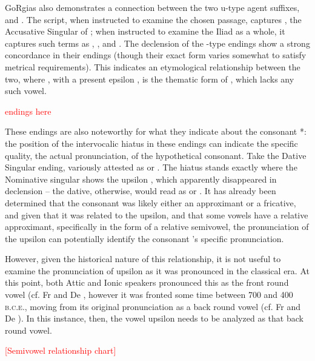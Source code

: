  GoRgias also demonstrates a connection between the two
u-type agent suffixes,  and . The script, when
instructed to examine the chosen passage, captures , the
Accusative Singular of ; when instructed to examine the
Iliad as a whole, it captures such terms as ,
, and . The declension of the -type
endings show a strong concordance in their endings (though
their exact form varies somewhat to satisfy metrical requirements).
This indicates an etymological relationship between the two, where
, with a present epsilon , is the
thematic form of , which lacks any such vowel. 

\textcolor{red}{ endings here}

These endings are also noteworthy for what they indicate about the
consonant *\w: the position of the intervocalic hiatus in these
endings can indicate the specific quality, the actual pronunciation,
of the hypothetical consonant.
Take the Dative Singular ending, variously attested as 
or . The hiatus stands exactly where the Nominative
singular shows the upsilon , which apparently
disappeared in declension -- the dative, otherwise, would read as
 or . It has already been determined
that the consonant was likely either an approximant or a fricative,
and given that it was related to the upsilon, and that some vowels
have a relative approximant, specifically in the form of a relative
semivowel, the pronunciation of the upsilon
can potentially identify the consonant \w's specific pronunciation.

However, given the historical nature of this relationship, it is not
useful to examine the pronunciation of upsilon  as it was
pronounced in the classical era. At this point, both Attic and
Ionic speakers pronounced this as the front round vowel 
(cf. Fr  and De , however it
was fronted some time between 700 and 400 \textsc{b.c.e.}, moving
from its original pronunciation as a back round vowel  (cf.
Fr  and De ).\autocite[529]{malikouti-drachman_bortone_2015}
In this instance, then, the vowel upsilon  needs to be
analyzed as that back round vowel. 

\textcolor{red}{[Semivowel relationship chart]}
%

